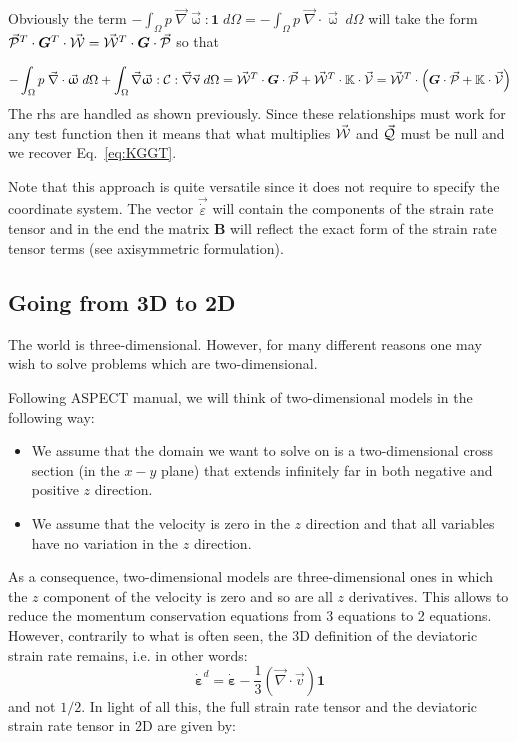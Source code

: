 Obviously the term 
$- \int_\Omega p \; \vec\nabla  \vec{\upomega} : {\bm 1}  \; d\Omega 
=- \int_\Omega p \; \vec\nabla \cdot \vec{\upomega}   \; d\Omega $
will take the form
$\vec{\cal P}^T \cdot {\bm G}^T \cdot \vec{\cal W} = 
\vec{\cal W}^T \cdot {\bm G} \cdot \vec{\cal P} $
so that 

\[
- \int_\Omega p \; \vec\nabla\cdot  \vec{\upomega}   \; d\Omega 
+ \int_\Omega \vec\nabla \vec{\upomega} : {\cal C} : \vec\nabla \vec\upnu\; d\Omega 
=
\vec{\cal W}^T \cdot {\bm G} \cdot \vec{\cal P} 
+
\vec{\cal W}^T \cdot \mathbb{K} \cdot \vec{\cal V} 
=
\vec{\cal W}^T \cdot \left( {\bm G} \cdot \vec{\cal P} + \mathbb{K} \cdot \vec{\cal V} \right)
\]
The rhs are handled as shown previously. 
Since these relationships must work for any test function then
it means that what multiplies $\vec{\cal W}$ and $\vec{\cal Q}$ must be null
and we recover Eq.~\eqref{eq:KGGT}.

Note that this approach is quite versatile since it does not require to specify the 
coordinate system. The vector $\vec{\dot \varepsilon}$ will contain the components of the 
strain rate tensor and in the end the matrix ${\bm B}$ will reflect the exact 
form of the strain rate tensor terms (see axisymmetric formulation).







\subsection{Going from 3D to 2D}

The world is three-dimensional. However, for many different reasons one may wish to solve problems
which are two-dimensional. 

Following ASPECT manual, we  will think of two-dimensional models in the following way: 
\begin{itemize}
\item We assume that the domain we want to solve on is a two-dimensional cross section (in the $x-y$ plane) 
that extends infinitely far in both negative and positive $z$ direction.  
\item We assume that the velocity is zero in the $z$ direction and that all variables 
have no variation in the $z$ direction. 
\end{itemize}

As a consequence, two-dimensional models are three-dimensional ones in which the $z$ 
component of the velocity is zero and so are all $z$ derivatives.
This allows to reduce the momentum conservation equations from 3 equations to 2 equations. 
However, contrarily to what is often seen, the 3D definition of the deviatoric strain rate 
remains, i.e. in other words:
\begin{equation}
\dot{\bm \varepsilon}^d = \dot{\bm \varepsilon} -\frac{1}{3}(\vec\nabla\cdot\vec v) {\bm 1} 
\end{equation}
and not $1/2$.
In light of all this, the full strain rate tensor and the 
deviatoric strain rate tensor in 2D are given by:

